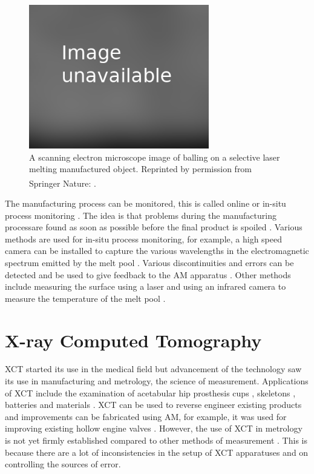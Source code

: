 \begin{figure}
  \centering
  \includegraphics[width=0.7\textwidth]{../figures/literatureReview/literature_balling.png}
  \caption{A scanning electron microscope image of balling on a selective laser melting manufactured object. Reprinted by permission from Springer Nature: \cite{li2012balling}\textsuperscript{\textcopyright}.}
  \label{fig:literature_balling}
\end{figure}

The manufacturing process can be monitored, this is called online or in-situ process monitoring \citep{everton2016review}. The idea is that problems during the manufacturing processare found as soon as possible before the final product is spoiled \citep{cerniglia2015inspection}. Various methods are used for in-situ process monitoring, for example, a high speed camera can be installed to capture the various wavelengths in the electromagnetic spectrum emitted by the melt pool \citep{berumen2010quality, craeghs2011online, lott2011design}. Various discontinuities and errors can be detected \citep{clijsters2014in} and be used to give feedback to the AM apparatus \citep{herzog2013method}. Other methods include measuring the surface using a laser \citep{cerniglia2015inspection} and using an infrared camera to measure the temperature of the melt pool \citep{rodriguez2012integration}. 

\section{X-ray Computed Tomography}

XCT started its use in the medical field but advancement of the technology saw its use in manufacturing and metrology, the science of measurement. Applications of XCT include the examination of acetabular hip prosthesis cups \citep{kourra2018computed}, skeletons \citep{appleby2014scoliosis}, batteries \citep{taiwo2017investigating} and materials \citep{zhang2016x, wang2017x}. XCT can be used to reverse engineer existing products and improvements can be fabricated using AM, for example, it was used for improving existing hollow engine valves \citep{cooper2015design}. However, the use of XCT in metrology is not yet firmly established compared to other methods of measurement \citep{thompson2016x}. This is because there are a lot of inconsistencies in the setup of XCT apparatuses and on controlling the sources of error.

